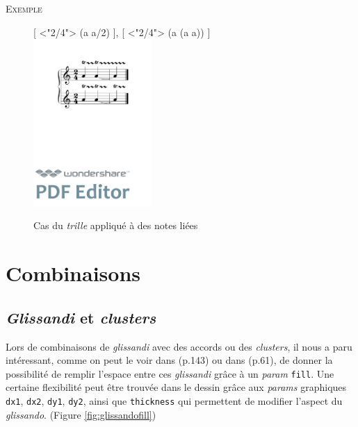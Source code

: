 \documentclass{article}
\newenvironment{gmncode}	{\vspace{-2mm}\small\verbatim}{\endverbatim\vspace{-2mm}}
\newcommand{\code}[1]		{{\small \texttt{#1}}}
\newcommand{\exemple}		{\vspace{2mm}\hspace*{-6mm}\textsc{Exemple}}
\begin{document}
\exemple
\begin{figure}[h]
\centering
\begin{gmncode}
{
  [
    \meter<"2/4"> \trill({a} {a/2})
  ],
  [
    \meter<"2/4"> \trill({a} \tie({a} {a}))
  ]
}
\end{gmncode}
\includegraphics[width=45mm]{img/trill.pdf}
\caption{Cas du \emph{trille} appliqué à des notes liées}
\label{fig:trill}
\end{figure}

\section{Combinaisons}\label{sec:combinaisons}

\subsection{\emph{Glissandi} et \emph{clusters}}\label{subsec:glissandiCluster}

Lors de combinaisons de \emph{glissandi}  avec des accords ou des \emph{clusters}, il nous a paru intéressant, comme on peut le voir dans \cite{gould2011behind} (p.143) ou dans \cite{stone1980music} (p.61), de donner la possibilité de remplir l'espace entre ces \emph{glissandi} grâce à un \emph{param} \code{fill}. Une certaine flexibilité peut être trouvée dans le dessin grâce aux \emph{params} graphiques \code{dx1}, \code{dx2}, \code{dy1}, \code{dy2}, ainsi que \code{thickness} qui permettent de modifier l'aspect du \emph{glissando}. (Figure \ref{fig:glissandofill})
\end{document}

